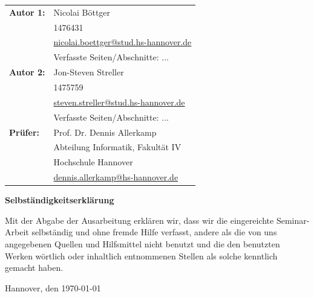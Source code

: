 \documentclass[12pt,DIV=14, version=first, BCOR=10mm,a4paper,twoside,parskip=half-,headsepline,headinclude]{scrartcl}
\begin{document}
  \newpage \thispagestyle{empty}
 \begin{tabular}{ll}
{\bfseries\sffamily Autor 1:} &  Nicolai Böttger \\
            & 1476431 \\
            & \href{mailto:nicolai.boettger@stud.hs-hannover.de}{nicolai.boettger@stud.hs-hannover.de} \\
            & Verfasste Seiten/Abschnitte: ...
            \\[5ex]
{\bfseries\sffamily Autor 2:} & Jon-Steven Streller \\
            & 1475759 \\
            & \href{mailto:steven.streller@stud.hs-hannover.de}{steven.streller@stud.hs-hannover.de} \\
           & Verfasste Seiten/Abschnitte: ... \\[5ex]
 {\bfseries\sffamily Prüfer:} &Prof. Dr. Dennis Allerkamp \\
          & Abteilung Informatik, Fakultät IV \\
         & Hochschule Hannover \\
        & \href{mailto:dennis.allerkamp@hs-hannover.de}{dennis.allerkamp@hs-hannover.de}
\end{tabular}

\vfill

\begin{center} \sffamily\bfseries Selbständigkeitserklärung \end{center}

Mit der Abgabe der Ausarbeitung erklären wir, dass wir die eingereichte Seminar-Arbeit
selbständig und ohne fremde Hilfe verfasst, andere als die von uns angegebenen Quellen
und Hilfsmittel nicht benutzt und die den benutzten Werken wörtlich oder
inhaltlich entnommenen Stellen als solche kenntlich gemacht haben.
\vspace*{7ex}

Hannover, den \today \hfill

\pagebreak

  \tableofcontents  %

\pagebreak

%


\end{document}
